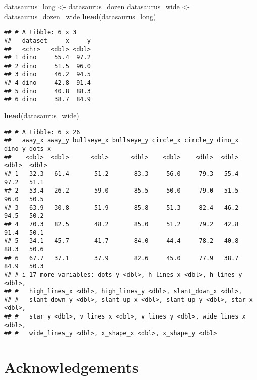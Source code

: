 \documentclass[
]{article}
\newenvironment{Shaded}{\begin{snugshade}}{\end{snugshade}}
\newcommand{\FunctionTok}[1]{\textcolor[rgb]{0.13,0.29,0.53}{\textbf{#1}}}
\newcommand{\NormalTok}[1]{#1}
\newcommand{\OtherTok}[1]{\textcolor[rgb]{0.56,0.35,0.01}{#1}}
\begin{document}
\begin{Shaded}
\begin{Highlighting}[]
\NormalTok{datasaurus\_long }\OtherTok{\textless{}{-}}\NormalTok{ datasaurus\_dozen}
\NormalTok{datasaurus\_wide }\OtherTok{\textless{}{-}}\NormalTok{ datasaurus\_dozen\_wide}
\FunctionTok{head}\NormalTok{(datasaurus\_long)}
\end{Highlighting}
\end{Shaded}

\begin{verbatim}
## # A tibble: 6 x 3
##   dataset     x     y
##   <chr>   <dbl> <dbl>
## 1 dino     55.4  97.2
## 2 dino     51.5  96.0
## 3 dino     46.2  94.5
## 4 dino     42.8  91.4
## 5 dino     40.8  88.3
## 6 dino     38.7  84.9
\end{verbatim}

\begin{Shaded}
\begin{Highlighting}[]
\FunctionTok{head}\NormalTok{(datasaurus\_wide)}
\end{Highlighting}
\end{Shaded}

\begin{verbatim}
## # A tibble: 6 x 26
##   away_x away_y bullseye_x bullseye_y circle_x circle_y dino_x dino_y dots_x
##    <dbl>  <dbl>      <dbl>      <dbl>    <dbl>    <dbl>  <dbl>  <dbl>  <dbl>
## 1   32.3   61.4       51.2       83.3     56.0     79.3   55.4   97.2   51.1
## 2   53.4   26.2       59.0       85.5     50.0     79.0   51.5   96.0   50.5
## 3   63.9   30.8       51.9       85.8     51.3     82.4   46.2   94.5   50.2
## 4   70.3   82.5       48.2       85.0     51.2     79.2   42.8   91.4   50.1
## 5   34.1   45.7       41.7       84.0     44.4     78.2   40.8   88.3   50.6
## 6   67.7   37.1       37.9       82.6     45.0     77.9   38.7   84.9   50.3
## # i 17 more variables: dots_y <dbl>, h_lines_x <dbl>, h_lines_y <dbl>,
## #   high_lines_x <dbl>, high_lines_y <dbl>, slant_down_x <dbl>,
## #   slant_down_y <dbl>, slant_up_x <dbl>, slant_up_y <dbl>, star_x <dbl>,
## #   star_y <dbl>, v_lines_x <dbl>, v_lines_y <dbl>, wide_lines_x <dbl>,
## #   wide_lines_y <dbl>, x_shape_x <dbl>, x_shape_y <dbl>
\end{verbatim}

\section{Acknowledgements}\label{acknowledgements}
\end{document}
